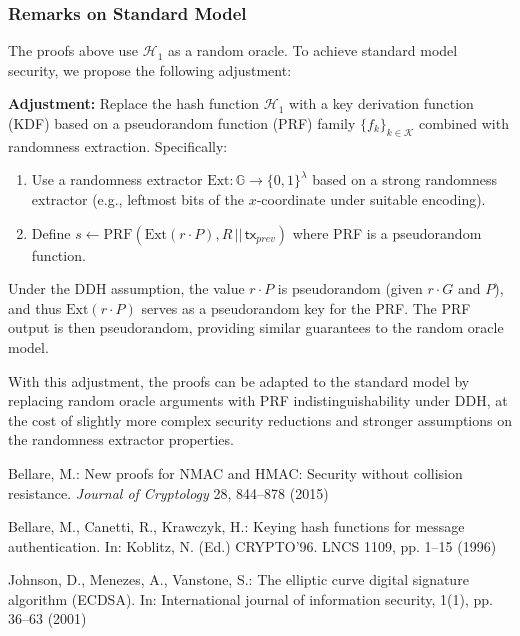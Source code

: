 \documentclass{article}
\begin{document}
\subsubsection{Remarks on Standard Model}

The proofs above use $\mathcal{H}_1$ as a random oracle. To achieve standard model security, we propose the following adjustment:

\textbf{Adjustment:} Replace the hash function $\mathcal{H}_1$ with a key derivation function (KDF) based on a pseudorandom function (PRF) family $\{f_k\}_{k \in \mathcal{K}}$ combined with randomness extraction. Specifically:
\begin{enumerate}
\item Use a randomness extractor $\text{Ext} \colon \mathbb{G} \to \{0,1\}^\lambda$ based on a strong randomness extractor (e.g., leftmost bits of the $x$-coordinate under suitable encoding).
\item Define $s \leftarrow \text{PRF}(\text{Ext}(r \cdot P), R \,||\, \mathsf{tx}_{prev})$ where PRF is a pseudorandom function.
\end{enumerate}

Under the DDH assumption, the value $r \cdot P$ is pseudorandom (given $r \cdot G$ and $P$), and thus $\text{Ext}(r \cdot P)$ serves as a pseudorandom key for the PRF. The PRF output is then pseudorandom, providing similar guarantees to the random oracle model.

With this adjustment, the proofs can be adapted to the standard model by replacing random oracle arguments with PRF indistinguishability under DDH, at the cost of slightly more complex security reductions and stronger assumptions on the randomness extractor properties.


% 


\begin{thebibliography}{99}
 Bellare, M.: New proofs for NMAC and HMAC: Security without collision resistance.  \emph{Journal of Cryptology} 28, 844--878 (2015)

Bellare, M., Canetti, R., Krawczyk, H.: Keying hash functions for message authentication.
In: Koblitz, N. (Ed.) CRYPTO’96. LNCS 1109, pp. 1--15 (1996)

Johnson, D., Menezes, A., Vanstone, S.: The elliptic curve digital signature algorithm (ECDSA). In: International journal of information security, 1(1), pp. 36--63 (2001)

\end{thebibliography}
\end{document}

